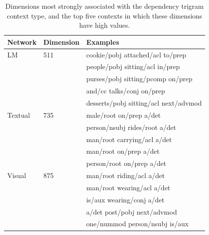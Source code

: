 \begin{table}
  \centering
  \caption{Dimensions most strongly associated with the dependency trigram context type, and the top five contexts in which these dimensions have high values.} 
\label{tab:mi-examples}
\begin{tabular}{lll}
  Network            & Dimension & Examples         \\\hline
  {\sc LM}           & 511       & cookie/pobj attached/acl to/prep \\
                     &           & people/pobj sitting/acl in/prep \\
                     &           & purses/pobj sitting/pcomp on/prep\\
                     &           & and/cc talks/conj on/prep \\
                     &           & desserts/pobj sitting/acl next/advmod \\\hline
  {\sc Textual}      & 735       & male/root on/prep a/det        \\
                     &           & person/nsubj rides/root a/det   \\
                     &           & man/root carrying/acl a/det \\
                     &           & man/root on/prep a/det         \\
                     &           & person/root on/prep a/det       \\\hline
  {\sc Visual}       &  875      & man/root riding/acl a/det \\
                     &           & man/root wearing/acl a/det \\
                     &           & is/aux wearing/conj a/det \\
                     &           & a/det post/pobj next/advmod \\
                     &           & one/nummod person/nsubj is/aux \\


\end{tabular}
\end{table}
